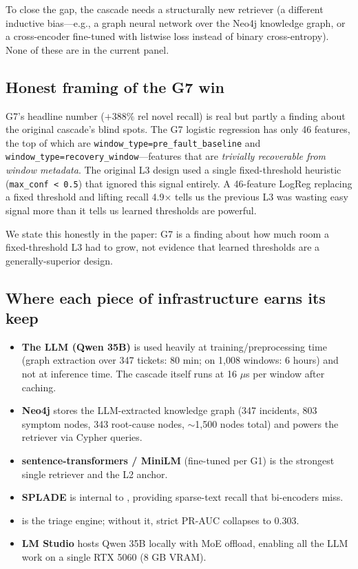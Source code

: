 To close the gap, the cascade needs a structurally new retriever (a different inductive bias---e.g., a graph neural network over the Neo4j knowledge graph, or a cross-encoder fine-tuned with listwise loss instead of binary cross-entropy). None of these are in the current panel.

\subsection{Honest framing of the G7 win}

G7's headline number ($+388\%$ rel novel recall) is real but partly a finding about the original cascade's blind spots. The G7 logistic regression has only 46 features, the top of which are \texttt{window\_type=pre\_fault\_baseline} and \texttt{window\_type=recovery\_window}---features that are \emph{trivially recoverable from window metadata}. The original L3 design used a single fixed-threshold heuristic (\texttt{max\_conf < 0.5}) that ignored this signal entirely. A 46-feature LogReg replacing a fixed threshold and lifting recall 4.9$\times$ tells us the previous L3 was wasting easy signal more than it tells us learned thresholds are powerful.

We state this honestly in the paper: G7 is a finding about how much room a fixed-threshold L3 had to grow, not evidence that learned thresholds are a generally-superior design.

\subsection{Where each piece of infrastructure earns its keep}

\begin{itemize}
\item \textbf{The LLM (Qwen 35B)} is used heavily at training/preprocessing time (graph extraction over 347 tickets: 80 min; \agent{} on 1{,}008 windows: 6 hours) and not at inference time. The cascade itself runs at 16 $\mu$s per window after caching.
\item \textbf{Neo4j} stores the LLM-extracted knowledge graph (347 incidents, 803 symptom nodes, 343 root-cause nodes, $\sim$1{,}500 nodes total) and powers the \kgret{} retriever via Cypher queries.
\item \textbf{sentence-transformers / MiniLM} (fine-tuned per G1) is the strongest single retriever and the L2 anchor.
\item \textbf{SPLADE} is internal to \hrrf{}, providing sparse-text recall that bi-encoders miss.
\item \textbf{\hgb{}} is the triage engine; without it, strict PR-AUC collapses to 0.303.
\item \textbf{LM Studio} hosts Qwen 35B locally with MoE offload, enabling all the LLM work on a single RTX 5060 (8 GB VRAM).
\end{itemize}


